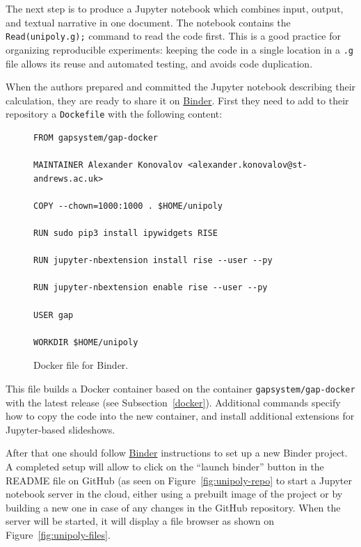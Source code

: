 The next step is to produce a Jupyter notebook which combines input,
output, and textual narrative in one document. The notebook contains
the {\tt Read(unipoly.g);} command to read the code first. This is
a good practice for organizing reproducible experiments: keeping the
code in a single location in a {\tt .g} file allows its reuse and
automated testing, and avoids code duplication. 

When the authors prepared and committed the Jupyter notebook describing
their calculation, they are ready to share it on
\href{https://mybinder.org/}{Binder}. First they need to add 
to their repository a {\tt Dockefile} with the following content:

\begin{figure}[!ht]
    \centering
    {\Small
\begin{verbatim}
FROM gapsystem/gap-docker

MAINTAINER Alexander Konovalov <alexander.konovalov@st-andrews.ac.uk>

COPY --chown=1000:1000 . $HOME/unipoly

RUN sudo pip3 install ipywidgets RISE

RUN jupyter-nbextension install rise --user --py

RUN jupyter-nbextension enable rise --user --py

USER gap

WORKDIR $HOME/unipoly
\end{verbatim}
    }
    \caption{Docker file for Binder.}
    \label{fig:pkgman-sample}
\end{figure}

This file builds a Docker container based on the container {\tt gapsystem/gap-docker}
with the latest \GAP release
(see Subsection~\ref{docker}). Additional commands specify how to copy the code into
the new container, and install additional extensions for Jupyter-based slideshows.

After that one should follow \href{https://mybinder.org/}{Binder} instructions to
set up a new Binder project. A completed setup will allow to click on the ``launch binder''
button in the README file on GitHub (as seen on Figure~\ref{fig:unipoly-repo}
to start a Jupyter notebook server in the cloud,
either using a prebuilt image of the project or by building a new one in case of any
changes in the GitHub repository. When the server will be started, it will display
a file browser as shown on Figure~\ref{fig:unipoly-files}.

